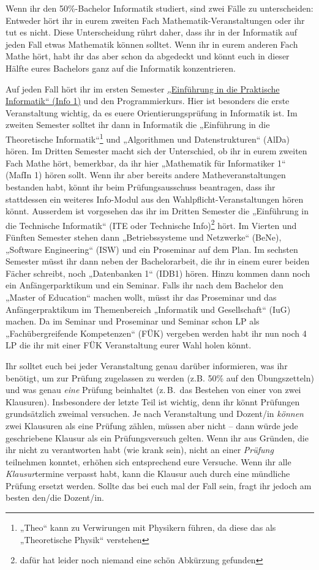Wenn ihr den 50\%-Bachelor Informatik studiert, sind zwei Fälle zu
unterscheiden: Entweder hört ihr in eurem zweiten Fach
Mathematik-Veranstaltungen oder ihr tut es nicht. Diese Unterscheidung rührt
daher, dass ihr in der Informatik auf jeden Fall etwas Mathematik können
solltet. Wenn ihr in eurem anderen Fach Mathe hört, habt ihr das aber schon da
abgedeckt und könnt euch in dieser Hälfte eures Bachelors ganz auf die
Informatik konzentrieren.

Auf jeden Fall hört ihr im ersten Semester \hyperref[info1]{„Einführung in die
Praktische Informatik“ (Info 1)} und den Programmierkurs. Hier ist besonders
die erste Veranstaltung wichtig, da es euere Orientierungsprüfung in Informatik
ist. Im zweiten Semester solltet ihr dann in Informatik die „Einführung in die
Theoretische Informatik“\footnote{„Theo“ kann zu Verwirungen mit Physikern
führen, da diese das als „Theoretische Physik“ verstehen} und „Algorithmen und
Datenstrukturen“ (AlDa) hören. Im Dritten Semester macht sich der Unterschied,
ob ihr in eurem zweiten Fach Mathe hört, bemerkbar, da ihr hier
„Mathematik für Informatiker 1“ (MafIn 1)  hören sollt.  Wenn ihr aber bereits
andere Matheveranstaltungen bestanden habt, könnt ihr beim Prüfungsausschuss
beantragen, dass ihr stattdessen ein weiteres Info-Modul aus den
Wahlpflicht-Veranstaltungen hören könnt.  Ausserdem ist vorgesehen das ihr im
Dritten Semester die „Einführung in die Technische Informatik“ (ITE oder
Technische Info)\footnote{dafür hat leider noch niemand eine schön Abkürzung
gefunden} hört.  Im Vierten und Fünften Semester stehen dann „Betriebssysteme
und Netzwerke“ (BeNe), „Software Engineering“ (ISW) und ein Proseminar auf dem
Plan. Im sechsten Semester müsst ihr dann neben der Bachelorarbeit, die ihr in
einem eurer beiden Fächer schreibt, noch „Datenbanken 1“ (IDB1) hören. Hinzu
kommen dann noch ein Anfängerparktikum und ein Seminar. Falls ihr nach dem
Bachelor den „Master of Education“ machen wollt, müsst ihr das Proseminar und
das Anfängerpraktikum im Themenbereich „Informatik und Gesellschaft“ (IuG)
machen.  Da im Seminar und Proseminar und Seminar schon LP als
„Fachübergreifende Kompetenzen“ (FÜK) vergeben werden habt ihr nun noch 4 LP
die ihr mit einer FÜK Veranstaltung eurer Wahl holen könnt.

Ihr solltet euch bei jeder Veranstaltung genau darüber informieren, was ihr
benötigt, um zur Prüfung zugelassen zu werden (z.B. 50\% auf den Übungszetteln)
und was genau \emph{eine} Prüfung beinhaltet (z.\,B.\ das Bestehen von einer von
zwei Klausuren). Insbesondere der letzte Teil ist wichtig, denn ihr könnt
Prüfungen grundsätzlich zweimal versuchen. Je nach Veranstaltung und Dozent/in
\emph{können} zwei Klausuren als eine Prüfung zählen, müssen aber nicht -- dann
würde jede geschriebene Klausur als ein Prüfungsversuch gelten. Wenn ihr aus
Gründen, die ihr nicht zu verantworten habt (wie krank sein), nicht an einer
\emph{Prüfung} teilnehmen konntet, erhöhen sich entsprechend eure Versuche.
Wenn ihr alle \emph{Klausur}termine verpasst habt, kann die Klausur auch durch
eine mündliche Prüfung ersetzt werden. Sollte das bei euch mal der Fall sein,
fragt ihr jedoch am besten den/die Dozent/in.

